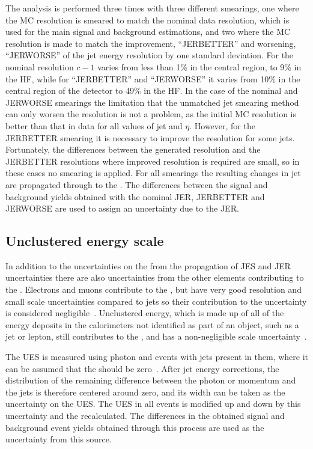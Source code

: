 The analysis is performed three times with three different smearings, one where the MC resolution is smeared to match the nominal data resolution, which is used for the main signal and background estimations, and two where the \ac{MC} resolution is made to match the improvement, ``JERBETTER'' and worsening, ``JERWORSE'' of the jet energy resolution by one standard deviation. For the nominal resolution $c-1$ varies from less than 1\% in the central region, to 9\% in the \ac{HF}, while for ``JERBETTER'' and ``JERWORSE'' it varies from 10\% in the central region of the detector to 49\% in the \ac{HF}. In the case of the nominal and JERWORSE smearings the limitation that the unmatched jet smearing method can only worsen the resolution is not a problem, as the initial \ac{MC} resolution is better than that in data for all values of jet \pt and $\eta$. However, for the JERBETTER smearing it is necessary to improve the resolution for some jets. Fortunately, the differences between the generated resolution and the JERBETTER resolutions where improved resolution is required are small, so in these cases no smearing is applied. For all smearings the resulting changes in jet \pt are propagated through to the \MET. The differences between the signal and background yields obtained with the nominal \ac{JER}, JERBETTER and JERWORSE are used to assign an uncertainty due to the \ac{JER}.

\subsection{Unclustered energy scale}
\label{sec:promptues}
In addition to the uncertainties on the \MET from the propagation of \ac{JES} and \ac{JER} uncertainties there are also uncertainties from the other elements contributing to the \MET. Electrons and muons contribute to the \MET, but have very good resolution and small scale uncertainties compared to jets so their contribution to the \MET uncertainty is considered negligible~\cite{CMS-PAS-JME-12-002}. Unclustered energy, which is made up of all of the energy deposits in the calorimeters not identified as part of an object, such as a jet or lepton, still contributes to the \MET, and has a non-negligible scale uncertainty~\cite{CMS-PAS-JME-12-002}. %

The \ac{UES} is measured using photon and \PZ events with jets present in them, where it can be assumed that the \MET should be zero~\cite{CMS-PAS-JME-12-002}. After jet energy corrections, the distribution of the remaining difference between the photon or \PZ momentum and the jets is therefore centered around zero, and its width can be taken as the uncertainty on the \ac{UES}. The \ac{UES} in all events is modified up and down by this uncertainty and the \MET recalculated. The differences in the obtained signal and background event yields obtained through this process are used as the uncertainty from this source.

